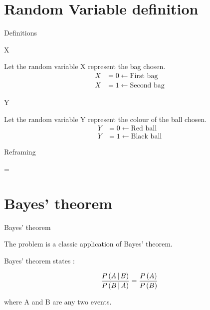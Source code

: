 \documentclass{beamer}
\begin{document}
	\section{Random Variable definition}
		\begin{frame}{Definitions}

			\begin{block}{X}
			
				Let the random variable X represent the bag chosen.
				\begin{align}
					X &= 0 \leftarrow \text{First bag} \nonumber \\
					X &= 1 \leftarrow \text{Second bag}
						\label{Xrange}
				\end{align}

			\end{block}

			\begin{block}{Y}
			
				Let the random variable Y represent the colour of the ball chosen.
				\begin{align}
					Y &= 0 \leftarrow \text{Red ball} \nonumber \\
					Y &= 1 \leftarrow \text{Black ball}
						\label{Yrange}
				\end{align}

			\end{block}

			\begin{block}{Reframing}
			
				\req \raggedright {} = 

			\end{block}

		\end{frame}

	\section{Bayes' theorem}
	
		\begin{frame}{Bayes' theorem}
		
			The problem is a classic application of Bayes' theorem.
			
			\begin{block}{}
			
				Bayes' theorem states :
				
				\begin{align}
					\frac{P\left(A \operatorname*{|} B\right)}{P\left(B \operatorname*{|} A\right)} = \frac{P\left(A\right)}{P\left(B\right)} 
						\label{Bayes_thm}
				\end{align}
				
				where A and B are any two events. 
			\end{block}

		\end{frame}
\end{document}
